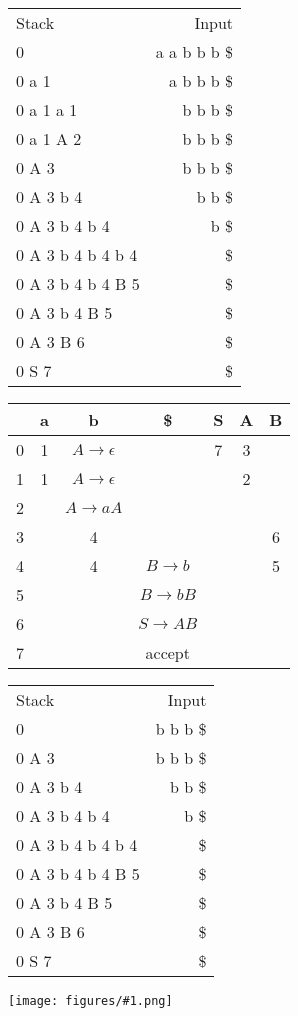 \documentclass[12pt]{article}
\newcommand{\myfig}[1]{\texttt{[image: figures/\#1.png]}}
\newcommand{\mt}{\ensuremath{\epsilon}}
\begin{document}
\begin{description}
\begin{tabular}{lr}
Stack & Input \\
0 & a a b b b \$\\
0 a 1 & a b b b \$\\
0 a 1 a 1 & b b b \$\\
0 a 1 A 2 & b b b \$\\
0 A 3 & b b b  \$\\
0 A 3 b 4 &  b b \$\\
0 A 3 b 4 b 4 & b \$\\
0 A 3 b 4 b 4 b 4 & \$\\
0 A 3 b 4 b 4 B 5 & \$\\
0 A 3 b 4 B 5 &  \$\\
0 A 3 B 6 &  \$\\
0 S 7 & \$\\
\end{tabular}
\begin{tabular}{|c|c|c|c|c|c|c|}\hline
 & a & b & \$ & S & A & B \\\hline
0 & 1 & $A\rightarrow\mt$&&7&3&\\\hline
1 & 1 & $A\rightarrow\mt$&&&2&\\\hline
2 &&$A\rightarrow aA$&&&&\\\hline
3 &&4&&&&6\\\hline
4 &&4&$B\rightarrow b$&&&5\\\hline
5 &&&$B\rightarrow bB$&&&\\\hline
6 &&&$S\rightarrow AB$&&&\\\hline
7 &&&accept&&&\\\hline
\end{tabular}


\begin{tabular}{lr}
Stack & Input \\
0 & b b b \$\\
0 A 3 & b b b \$\\
0 A 3 b 4 & b b \$\\
0 A 3 b 4 b 4 & b \$\\
0 A 3 b 4 b 4  b 4 & \$\\
0 A 3 b 4 b 4  B 5 & \$\\
0 A 3 b 4 B 5 & \$\\
0 A 3 B 6 & \$\\
0 S 7 & \$\\
\end{tabular}
\myfig{lrparseexamples04}


\newcommand{\arr}[2]{$#1\rightarrow #2$}
\newcommand{\arrl}[1]{$#1\rightarrow \mt$}


\end{description}
\end{document}
